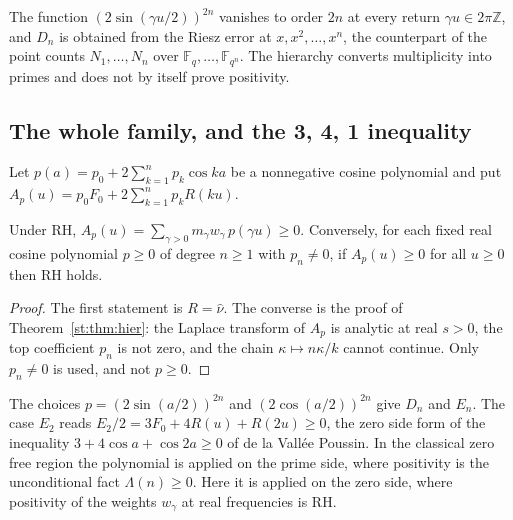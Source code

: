The function $(2\sin(\gamma u/2))^{2n}$ vanishes to order $2n$ at every return $\gamma u\in2\pi\mathbb Z$, and $D_n$ is obtained from the Riesz error at $x,x^2,\dots,x^n$, the counterpart of the point counts $N_1,\dots,N_n$ over $\mathbb F_q,\dots,\mathbb F_{q^n}$. The hierarchy converts multiplicity into primes and does not by itself prove positivity.
\subsection{The whole family, and the 3, 4, 1 inequality}
Let $p(a)=p_0+2\sum_{k=1}^np_k\cos ka$ be a nonnegative cosine polynomial and put $A_p(u)=p_0F_0+2\sum_{k=1}^np_kR(ku)$.
\begin{theorem}\label{st:thm:family}
Under RH, $A_p(u)=\sum_{\gamma>0}m_\gamma w_\gamma\,p(\gamma u)\ge0$. Conversely, for each fixed real cosine polynomial $p\ge0$ of degree $n\ge1$ with $p_n\ne0$, if $A_p(u)\ge0$ for all $u\ge0$ then RH holds.
\end{theorem}
\begin{proof}
The first statement is $R=\hat\nu$. The converse is the proof of Theorem~\ref{st:thm:hier}: the Laplace transform of $A_p$ is analytic at real $s>0$, the top coefficient $p_n$ is not zero, and the chain $\kappa\mapsto n\kappa/k$ cannot continue. Only $p_n\ne0$ is used, and not $p\ge0$.
\end{proof}
The choices $p=(2\sin(a/2))^{2n}$ and $(2\cos(a/2))^{2n}$ give $D_n$ and $E_n$. The case $E_2$ reads $E_2/2=3F_0+4R(u)+R(2u)\ge0$, the zero side form of the inequality $3+4\cos a+\cos2a\ge0$ of de la Vall\'ee Poussin. In the classical zero free region the polynomial is applied on the prime side, where positivity is the unconditional fact $\Lambda(n)\ge0$. Here it is applied on the zero side, where positivity of the weights $w_\gamma$ at real frequencies is RH.

